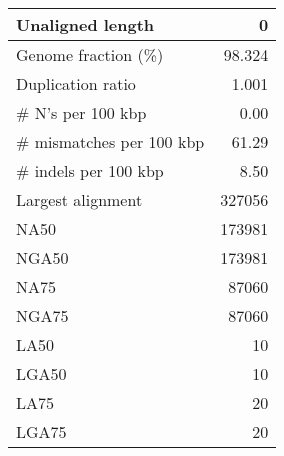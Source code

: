 \documentclass[12pt,a4paper]{article}
\begin{document}
\begin{table}[ht]
\begin{center}
\begin{tabular}{|l*{1}{|r}|}
Unaligned length & 0 \\ \hline
Genome fraction (\%) & 98.324 \\ \hline
Duplication ratio & 1.001 \\ \hline
\# N's per 100 kbp & 0.00 \\ \hline
\# mismatches per 100 kbp & 61.29 \\ \hline
\# indels per 100 kbp & 8.50 \\ \hline
Largest alignment & 327056 \\ \hline
NA50 & 173981 \\ \hline
NGA50 & 173981 \\ \hline
NA75 & 87060 \\ \hline
NGA75 & 87060 \\ \hline
LA50 & 10 \\ \hline
LGA50 & 10 \\ \hline
LA75 & 20 \\ \hline
LGA75 & 20 \\ \hline
\end{tabular}
\end{center}
\end{table}
\end{document}
